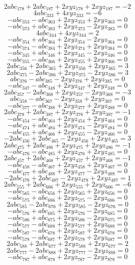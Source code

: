 \[ 2 abc_{178} + 2 abc_{187} + 2 xyz_{178} + 2 xyz_{187} = -2 \]
\[ 4 abc_{333} + 4 xyz_{333} = -6 \]
\[ - abc_{353} - abc_{363} + 2 xyz_{353} + 2 xyz_{363} = 0 \]
\[ - abc_{373} + abc_{383} + 2 xyz_{373} - 2 xyz_{383} = 0 \]
\[ 4 abc_{344} + 4 xyz_{344} = 2 \]
\[ - abc_{354} + abc_{364} + 2 xyz_{354} - 2 xyz_{364} = 0 \]
\[ - abc_{374} - abc_{384} + 2 xyz_{374} + 2 xyz_{384} = 0 \]
\[ - abc_{345} + abc_{346} + 2 xyz_{345} - 2 xyz_{346} = 0 \]
\[ - abc_{355} - abc_{366} + 2 xyz_{355} + 2 xyz_{366} = 0 \]
\[ 2 abc_{356} + 2 abc_{365} + 2 xyz_{356} + 2 xyz_{365} = 3 \]
\[ 2 abc_{375} - 2 abc_{386} + 2 xyz_{375} - 2 xyz_{386} = 3 \]
\[ abc_{376} - abc_{385} - 2 xyz_{376} + 2 xyz_{385} = 0 \]
\[ - abc_{347} - abc_{348} + 2 xyz_{347} + 2 xyz_{348} = 0 \]
\[ 2 abc_{357} - 2 abc_{368} + 2 xyz_{357} - 2 xyz_{368} = -3 \]
\[ abc_{358} - abc_{367} - 2 xyz_{358} + 2 xyz_{367} = 0 \]
\[ - abc_{377} - abc_{388} + 2 xyz_{377} + 2 xyz_{388} = 0 \]
\[ 2 abc_{378} + 2 abc_{387} + 2 xyz_{378} + 2 xyz_{387} = -1 \]
\[ - abc_{454} - abc_{464} + 2 xyz_{454} + 2 xyz_{464} = 0 \]
\[ - abc_{474} + abc_{484} + 2 xyz_{474} - 2 xyz_{484} = 0 \]
\[ - abc_{455} + abc_{466} + 2 xyz_{455} - 2 xyz_{466} = 0 \]
\[ - 2 abc_{456} + 2 abc_{465} - 2 xyz_{456} + 2 xyz_{465} = 3 \]
\[ 2 abc_{475} + 2 abc_{486} + 2 xyz_{475} + 2 xyz_{486} = -1 \]
\[ - abc_{476} - abc_{485} + 2 xyz_{476} + 2 xyz_{485} = 0 \]
\[ 2 abc_{457} + 2 abc_{468} + 2 xyz_{457} + 2 xyz_{468} = -1 \]
\[ - abc_{458} - abc_{467} + 2 xyz_{458} + 2 xyz_{467} = 0 \]
\[ - abc_{477} + abc_{488} + 2 xyz_{477} - 2 xyz_{488} = 0 \]
\[ - 2 abc_{478} + 2 abc_{487} - 2 xyz_{478} + 2 xyz_{487} = 1 \]
\[ 2 abc_{555} + 2 abc_{666} + 2 xyz_{555} + 2 xyz_{666} = -6 \]
\[ - abc_{565} - abc_{656} + 2 xyz_{565} + 2 xyz_{656} = 0 \]
\[ - abc_{575} + abc_{686} + 2 xyz_{575} - 2 xyz_{686} = 0 \]
\[ 2 abc_{585} - 2 abc_{676} + 2 xyz_{585} - 2 xyz_{676} = 0 \]
\[ - abc_{576} + abc_{685} + 2 xyz_{576} - 2 xyz_{685} = 0 \]
\[ - abc_{586} + abc_{675} + 2 xyz_{586} - 2 xyz_{675} = 0 \]
\[ - abc_{577} - abc_{688} + 2 xyz_{577} + 2 xyz_{688} = 0 \]
\[ - abc_{587} - abc_{678} + 2 xyz_{587} + 2 xyz_{678} = 0 \]
\[ - abc_{578} - abc_{687} + 2 xyz_{578} + 2 xyz_{687} = 0 \]
\[ 2 abc_{588} + 2 abc_{677} + 2 xyz_{588} + 2 xyz_{677} = 2 \]
\[ 2 abc_{777} - 2 abc_{888} + 2 xyz_{777} - 2 xyz_{888} = 0 \]
\[ - abc_{787} + abc_{878} + 2 xyz_{787} - 2 xyz_{878} = 0 \]
